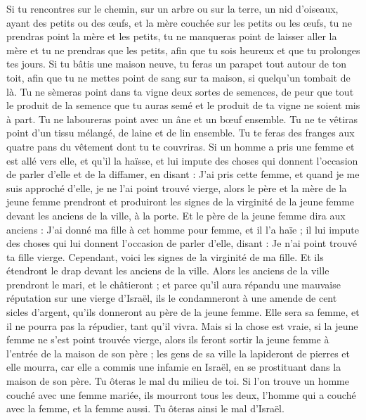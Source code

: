 \begin{multicols}{2}
Si tu rencontres sur le chemin, sur un arbre ou sur la terre, un nid d'oiseaux, ayant des petits ou des œufs, et la mère couchée sur les petits ou les œufs, tu ne prendras point la mère et les petits,
tu ne manqueras point de laisser aller la mère et tu ne prendras que les petits, afin que tu sois heureux et que tu prolonges tes jours.
Si tu bâtis une maison neuve, tu feras un parapet tout autour de ton toit, afin que tu ne mettes point de sang sur ta maison, si quelqu'un tombait de là.
Tu ne sèmeras point dans ta vigne deux sortes de semences, de peur que tout le produit de la semence que tu auras semé et le produit de ta vigne ne soient mis à part.
Tu ne laboureras point avec un âne et un bœuf ensemble.
Tu ne te vêtiras point d'un tissu mélangé, de laine et de lin ensemble.
Tu te feras des franges aux quatre pans du vêtement dont tu te couvriras.
Si un homme a pris une femme et est allé vers elle, et qu’il la haïsse,
et lui impute des choses qui donnent l’occasion de parler d’elle et de la diffamer, en disant : J'ai pris cette femme, et quand je me suis approché d'elle, je ne l'ai point trouvé vierge,
alors le père et la mère de la jeune femme prendront et produiront les signes de la virginité de la jeune femme devant les anciens de la ville, à la porte.
Et le père de la jeune femme dira aux anciens : J'ai donné ma fille à cet homme pour femme, et il l'a haïe ;
il lui impute des choses qui lui donnent l’occasion de parler d’elle, disant : Je n'ai point trouvé ta fille vierge. Cependant, voici les signes de la virginité de ma fille. Et ils étendront le drap devant les anciens de la ville.
Alors les anciens de la ville prendront le mari, et le châtieront ;
et parce qu'il aura répandu une mauvaise réputation sur une vierge d'Israël, ils le condamneront à une amende de cent sicles d'argent, qu’ils donneront au père de la jeune femme. Elle sera sa femme, et il ne pourra pas la répudier, tant qu'il vivra.
Mais si la chose est vraie, si la jeune femme ne s’est point trouvée vierge,
alors ils feront sortir la jeune femme à l’entrée de la maison de son père ; les gens de sa ville la lapideront de pierres et elle mourra, car elle a commis une infamie en Israël, en se prostituant dans la maison de son père. Tu ôteras le mal du milieu de toi.
Si l’on trouve un homme couché avec une femme mariée, ils mourront tous les deux, l'homme qui a couché avec la femme, et la femme aussi. Tu ôteras ainsi le mal d'Israël.

\end{multicols}
